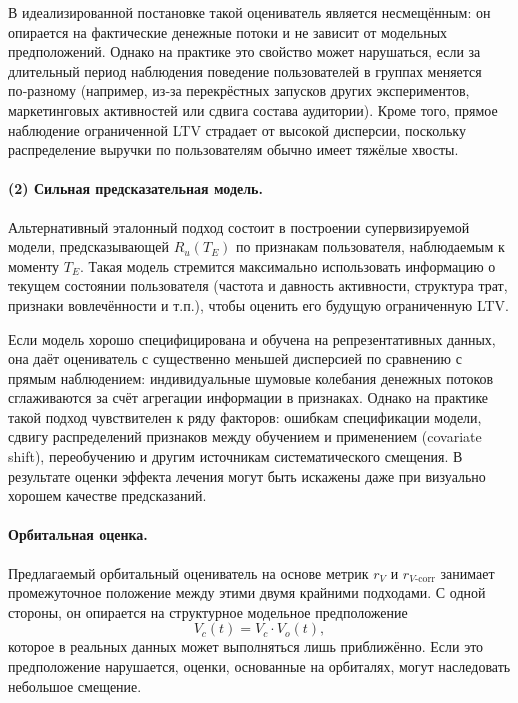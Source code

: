 В идеализированной постановке такой оцениватель является несмещённым:
он опирается на фактические денежные потоки и не зависит от
модельных предположений. Однако на практике это свойство может
нарушаться, если за длительный период наблюдения поведение
пользователей в группах меняется по‑разному (например, из‑за
перекрёстных запусков других экспериментов, маркетинговых активностей
или сдвига состава аудитории). Кроме того, прямое наблюдение
ограниченной LTV страдает от высокой дисперсии, поскольку распределение
выручки по пользователям обычно имеет тяжёлые хвосты.


\paragraph{(2) Сильная предсказательная модель.}


Альтернативный эталонный подход состоит в построении
супервизируемой модели, предсказывающей $R_u(T_E)$ по признакам
пользователя, наблюдаемым к моменту $T_E$. Такая модель стремится
максимально использовать информацию о текущем состоянии пользователя
(частота и давность активности, структура трат, признаки вовлечённости
и т.п.), чтобы оценить его будущую ограниченную LTV.

Если модель хорошо специфицирована и обучена на репрезентативных
данных, она даёт оцениватель с существенно меньшей дисперсией по
сравнению с прямым наблюдением: индивидуальные шумовые колебания
денежных потоков сглаживаются за счёт агрегации информации в признаках.
Однако на практике такой подход чувствителен к ряду факторов:
ошибкам спецификации модели, сдвигу распределений признаков между
обучением и применением (covariate shift), переобучению и другим
источникам систематического смещения. В результате оценки эффекта
лечения могут быть искажены даже при визуально хорошем качестве
предсказаний.


\paragraph{Орбитальная оценка.}

Предлагаемый орбитальный оцениватель на основе метрик $r_V$ и
$r_{V\text{-corr}}$ занимает промежуточное положение между этими двумя
крайними подходами. С одной стороны, он опирается на структурное
модельное предположение
\[
  V_c(t) = V_c \cdot V_o(t),
\]
которое в реальных данных может выполняться лишь приближённо. Если
это предположение нарушается, оценки, основанные на орбиталях, могут
наследовать небольшое смещение.

